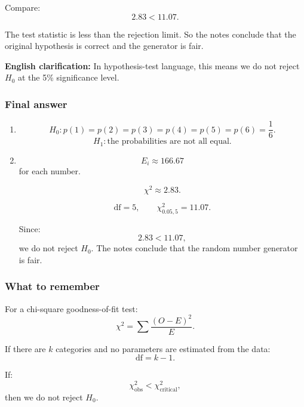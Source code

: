 \documentclass[10pt]{article}
\begin{document}
Compare:
\[
2.83<11.07.
\]

The test statistic is less than the rejection limit.
So the notes conclude that the original hypothesis is
correct and the generator is fair.

\textbf{English clarification:}
In hypothesis-test language, this means we do not
reject \(H_0\) at the 5\% significance level.

\subsubsection*{Final answer}

\begin{enumerate}[label=\alph*)]
\item
\[
H_0:
p(1)=p(2)=p(3)=p(4)=p(5)=p(6)
=\frac{1}{6}.
\]
\[
H_1:
\text{the probabilities are not all equal.}
\]

\item
\[
E_i\approx 166.67
\]
for each number.

\[
\chi^2\approx 2.83.
\]

\[
\text{df}=5,
\qquad
\chi^2_{0.05,5}=11.07.
\]

Since:
\[
2.83<11.07,
\]
we do not reject \(H_0\). The notes conclude that
the random number generator is fair.
\end{enumerate}

\subsubsection*{What to remember}

For a chi-square goodness-of-fit test:
\[
\chi^2
=
\sum
\frac{(O-E)^2}{E}.
\]

If there are \(k\) categories and no parameters are
estimated from the data:
\[
\text{df}=k-1.
\]

If:
\[
\chi^2_{\text{obs}}
<
\chi^2_{\text{critical}},
\]
then we do not reject \(H_0\).
\end{document}
